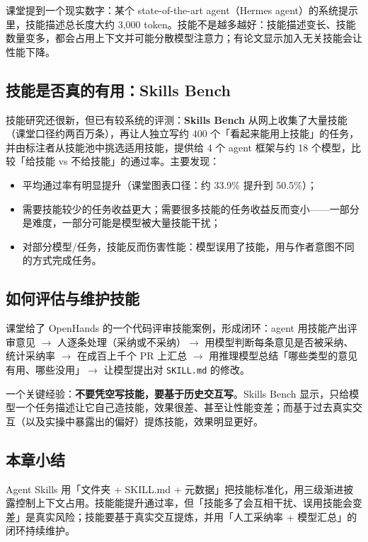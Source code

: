 ﻿\documentclass[a4paper]{article}
\begin{document}
课堂提到一个现实数字：某个 state-of-the-art agent（Hermes agent）的系统提示里，技能描述总长度大约 3,000 token。技能不是越多越好：技能描述变长、技能数量变多，都会占用上下文并可能分散模型注意力；有论文显示加入无关技能会让性能下降。

\subsection{技能是否真的有用：Skills Bench}

技能研究还很新，但已有较系统的评测：\textbf{Skills Bench} 从网上收集了大量技能（课堂口径约两百万条），再让人独立写约 400 个「看起来能用上技能」的任务，并由标注者从技能池中挑选适用技能，提供给 4 个 agent 框架与约 18 个模型，比较「给技能 vs 不给技能」的通过率。主要发现：

\begin{itemize}
\item 平均通过率有明显提升（课堂图表口径：约 33.9\% 提升到 50.5\%）；
\item 需要技能较少的任务收益更大；需要很多技能的任务收益反而变小——一部分是难度，一部分可能是模型被大量技能干扰；
\item 对部分模型/任务，技能反而伤害性能：模型误用了技能，用与作者意图不同的方式完成任务。
\end{itemize}

\subsection{如何评估与维护技能}

课堂给了 OpenHands 的一个代码评审技能案例，形成闭环：agent 用技能产出评审意见 $\rightarrow$ 人逐条处理（采纳或不采纳）$\rightarrow$ 用模型判断每条意见是否被采纳、统计采纳率 $\rightarrow$ 在成百上千个 PR 上汇总 $\rightarrow$ 用推理模型总结「哪些类型的意见有用、哪些没用」$\rightarrow$ 让模型提出对 \texttt{SKILL.md} 的修改。

一个关键经验：\textbf{不要凭空写技能，要基于历史交互写}。Skills Bench 显示，只给模型一个任务描述让它自己造技能，效果很差、甚至让性能变差；而基于过去真实交互（以及实操中暴露出的偏好）提炼技能，效果明显更好。

\subsection{本章小结}
Agent Skills 用「文件夹 + SKILL.md + 元数据」把技能标准化，用三级渐进披露控制上下文占用。技能能提升通过率，但「技能多了会互相干扰、误用技能会变差」是真实风险；技能要基于真实交互提炼，并用「人工采纳率 + 模型汇总」的闭环持续维护。
\end{document}
